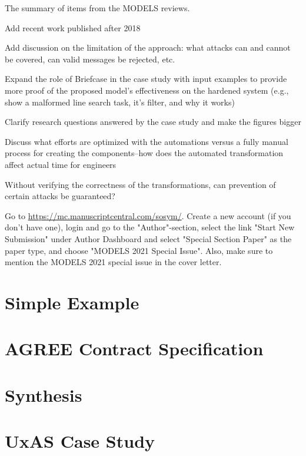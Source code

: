 \documentclass[global,twocolumn]{svjour}
\begin{document}
\noindent The summary of items from the MODELS reviews.
\begin{compactitem}
  \item Add recent work published after 2018
  \item Add discussion on the limitation of the approach: what attacks can and cannot be covered, can valid messages be rejected, etc.
  \item Expand the role of Briefcase in the case study with input examples to provide more proof of the proposed model's effectiveness on the hardened system (e.g., show a malformed line search task, it's filter, and why it works) 
  \item Clarify research questions answered by the case study and make the figures bigger
  \item Discuss what efforts are optimized with the automations versus a fully manual process for creating the components--how does the automated transformation affect actual time for engineers
  \item Without verifying the correctness of the transformations, can prevention of certain attacks be guaranteed?
\end{compactitem}
\noindent Go to \url{https://mc.manuscriptcentral.com/sosym/}. Create a new account (if you don't have one), login and go to the "Author"-section, select the link "Start New Submission" under Author Dashboard and select "Special Section Paper" as the paper type, and choose "MODELS 2021 Special Issue". Also, make sure to mention the MODELS 2021 special issue in the cover letter.

\section{Simple Example} \label{sec:example}


\section{AGREE Contract Specification} \label{sec:agree}


\section{Synthesis} \label{sec:synthesis}


\section{UxAS Case Study} \label{sec:case-study}

\end{document}
